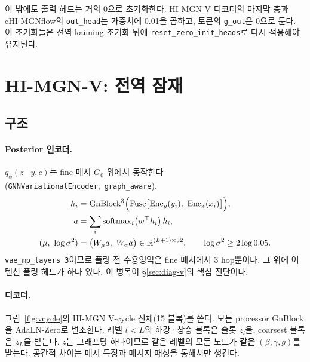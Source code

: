 \documentclass[11pt]{article}
\newcommand{\R}{\mathbb{R}}
\newcommand{\code}[1]{\texttt{#1}}
\begin{document}
이 밖에도 출력 헤드는 거의 0으로 초기화한다. HI-MGN-V 디코더의 마지막 층과
cHI-MGNflow의 \code{out\_head}는 가중치에 0.01을 곱하고, 토큰의
\code{g\_out}은 0으로 둔다. 이 초기화들은 전역 kaiming 초기화 뒤에
\code{reset\_zero\_init\_heads}로 다시 적용해야 유지된다.

\section{HI-MGN-V: 전역 잠재}\label{sec:himgnv}

\subsection{구조}

\paragraph{Posterior 인코더.} $q_\phi(z\mid y,c)$는 fine 메시 $G_0$ 위에서
동작한다(\code{GNNVariationalEncoder},\allowbreak\ \code{graph\_aware}).
\begin{align}
  h_i &= \mathrm{GnBlock}^{3}\Bigl(\mathrm{Fuse}\bigl[\mathrm{Enc}_y(y_i),\ \mathrm{Enc}_x(x_i)\bigr]\Bigr), \\
  a &= \sum_i \mathrm{softmax}_i\bigl(w^\top h_i\bigr)\,h_i, \\
  (\mu,\ \log\sigma^2) &= \bigl(W_\mu a,\ W_\sigma a\bigr)\in\R^{(L+1)\times 32},\qquad
  \log\sigma^2 \ge 2\log 0.05 .
\end{align}
\code{vae\_mp\_layers 3}이므로 풀링 전 수용영역은 fine 메시에서 3 hop뿐이다.
그 위에 어텐션 풀링 헤드가 하나 있다. 이 병목이 \S\ref{sec:diag-v}의 핵심
진단이다.

\paragraph{디코더.} 그림~\ref{fig:vcycle}의 HI-MGN V-cycle 전체(15 블록)를
쓴다. 모든 processor GnBlock을 AdaLN-Zero로 변조한다. 레벨 $l<L$의 하강·상승
블록은 슬롯 $z_l$을, coarsest 블록은 $z_L$을 받는다. $z$는 그래프당 하나이므로
같은 레벨의 모든 노드가 \textbf{같은} $(\beta,\gamma,g)$를 받는다. 공간적
차이는 메시 특징과 메시지 패싱을 통해서만 생긴다.
\end{document}
